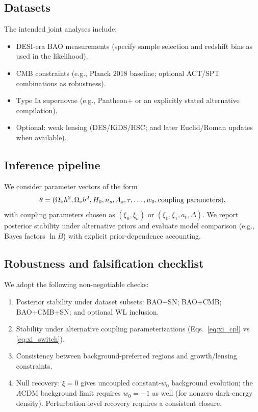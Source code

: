 \documentclass[reprint,aps,prd,nofootinbib,superscriptaddress]{revtex4-2}
\newcommand{\LCDM}{\ensuremath{\Lambda\mathrm{CDM}}\xspace}
\begin{document}
\subsection{Datasets}

The intended joint analyses include:
\begin{itemize}
\item DESI-era BAO measurements (specify sample selection and redshift bins as used in the likelihood).
\item CMB constraints (e.g., Planck 2018 baseline; optional ACT/SPT combinations as robustness).
\item Type Ia supernovae (e.g., Pantheon+ or an explicitly stated alternative compilation).
\item Optional: weak lensing (DES/KiDS/HSC; and later Euclid/Roman updates when available).
\end{itemize}

\subsection{Inference pipeline}

We consider parameter vectors of the form
\begin{equation}
\theta = (\Omega_{\rm b}h^2,\Omega_{\rm c}h^2, H_0, n_s, A_s, \tau, \ldots, w_0, \text{coupling parameters}),
\end{equation}
with coupling parameters chosen as $(\xi_0,\xi_a)$ or $(\xi_0,\xi_1,a_t,\Delta)$.
We report posterior stability under alternative priors and evaluate model comparison (e.g., Bayes factors $\ln B$) with explicit prior-dependence accounting.

\subsection{Robustness and falsification checklist}

We adopt the following non-negotiable checks:
\begin{enumerate}
\item Posterior stability under dataset subsets: BAO+SN; BAO+CMB; BAO+CMB+SN; and optional WL inclusion.
\item Stability under alternative coupling parameterizations (Eqs.~\eqref{eq:xi_cpl} vs \eqref{eq:xi_switch}).
\item Consistency between background-preferred regions and growth/lensing constraints.
\item Null recovery: $\xi=0$ gives uncoupled constant-$w_0$ background evolution; the \LCDM background limit requires $w_0=-1$ as well (for nonzero dark-energy density). Perturbation-level recovery requires a consistent closure.
\end{enumerate}
\end{document}
